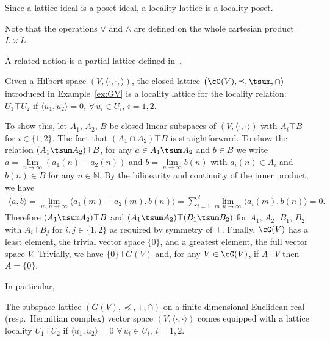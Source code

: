 \documentclass[pdftex]{sigma}
\numberwithin{equation}{section}
\newcommand{\N}{\mathbb{N}}
\newcommand{\loc}{locality\xspace}
\begin{document}
Since a lattice ideal is a poset ideal, a \loc lattice is a \loc poset.

Note that the operations $\vee$ and $\wedge$ are defined on the whole cartesian product $L\times L$. \begin{Remark}A related notion is a partial lattice defined in~\cite[Section~I5.4]{Gra1}.
	\end{Remark}

\begin{Example} \label{ex:GVlocality} Given a Hilbert space $(V, \langle \cdot, \cdot, \rangle)$, the closed \subsp lattice $\big(\cG(V),\preceq,\tsum,\cap\big)$ introduced in Example~\ref{ex:GV} is a \loc lattice for the \loc relation: $U_1\top U_2$ if $\langle u_1, u_2\rangle=0$, $\forall\, u_i\in U_i$, $i=1,2$.

To show this, let $A_1$, $A_2$, $B$ be closed linear subspaces of $(V, \langle\cdot, \cdot\rangle)$ with $A_i\top B$ for $i\in\{1,2\}$. The fact that $(A_1\cap A_2) \top B$ is
straightforward. To show the relation $(A_1\tsum A_2) \top B$, for any $a\in A_1\tsum A_2$ and $b\in B$ we write $a=\underset{n\to \infty}{\lim}(a_1(n)+a_2(n))$ and $b=\underset{n\to \infty}{\lim} b(n)$ with $a_i(n)\in A_i$ and $b(n)\in B$ for any $n\in \N$.
By the bilinearity and continuity of the inner product, we have
\begin{gather*}
\langle a,b\rangle = \underset{m,n\to \infty}{\lim}\langle a_1(m)+a_2(m),b(n)\rangle = \sum_{i=1}^2\underset{m,n\to \infty}{\lim}\langle a_i(m),b(n)\rangle=0.
\end{gather*}
Therefore $(A_1\tsum A_2) \top B$ and $(A_1\tsum A_2) \top (B_1\tsum B_2)$ for $A_1$, $A_2$, $B_1$, $B_2$ with $A_i\top B_j$ for $i,j\in\{1,2\}$ as required by symmetry of $\top$. Finally, $\cG(V)$ has a least element, the trivial vector space $\{0\}$, and a greatest
element, the full vector space $V$. Trivially, we have $\{0\}\top G(V)$ and, for any $V\in \cG(V)$, if $A\top V$ then $ A=\{0\}$.
\end{Example}
In particular,
\begin{Example} %
The subspace lattice $(G(V), \preceq, +, \cap)$ on a finite dimensional Euclidean real (resp.~Hermitian complex) vector space $(V, \langle \cdot, \cdot\rangle)$ comes equipped with a lattice locality $U_1\top U_2$ if $\langle u_1, u_2\rangle=0$ $\forall\, u_i\in U_i$, $i=1,2$.
	\end{Example}
\end{document}
